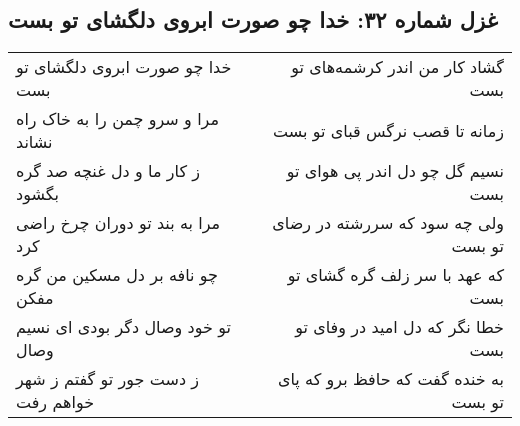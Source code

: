 \begin{center}
\section*{غزل شماره ۳۲: خدا چو صورت ابروی دلگشای تو بست}
\label{sec:sh032}
\begin{longtable}{l p{0.5cm} r}
خدا چو صورت ابروی دلگشای تو بست
&&
گشاد کار من اندر کرشمه‌های تو بست
\\
مرا و سرو چمن را به خاک راه نشاند
&&
زمانه تا قصب نرگس قبای تو بست
\\
ز کار ما و دل غنچه صد گره بگشود
&&
نسیم گل چو دل اندر پی هوای تو بست
\\
مرا به بند تو دوران چرخ راضی کرد
&&
ولی چه سود که سررشته در رضای تو بست
\\
چو نافه بر دل مسکین من گره مفکن
&&
که عهد با سر زلف گره گشای تو بست
\\
تو خود وصال دگر بودی ای نسیم وصال
&&
خطا نگر که دل امید در وفای تو بست
\\
ز دست جور تو گفتم ز شهر خواهم رفت
&&
به خنده گفت که حافظ برو که پای تو بست
\\
\end{longtable}
\end{center}
